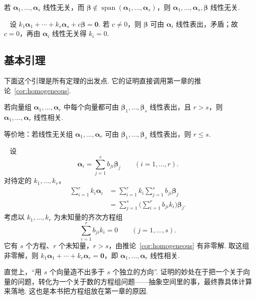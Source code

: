 \documentclass[lang=cn,10.5pt,scheme=chinese,toc=twocol,section,chinesefont=nofont,
twoside,citestyle=gb7714-2015,bibstyle=gb7714-2015]{elegantbook}
\DeclareRobustCommand{\textbf}[1]{{\lnsemiboldlatin\lnsemiboldcjk #1}}
\newcommand{\vv}[1]{\boldsymbol{#1}}
\newcommand{\zero}{\boldsymbol{0}}          %
\numberwithin{equation}{section}   %
\newcommand{\spn}{\operatorname{span}}      %
\newcommand*{\lnlabel}[1]{{\sffamily\bfseries\color{black}#1}}
\renewenvironment{proof}{%
	\par\noindent\lnlabel{\proofname}\;\ \color{black!90}\cfs}{\par}
\begin{document}
\begin{lemma}
  \label{lem:addone}
  若 $\vv\alpha_1,\ldots,\vv\alpha_s$ 线性无关，而 $\vv\beta\notin\spn(\vv\alpha_1,\ldots,\vv\alpha_s)$，则 $\vv\alpha_1,\ldots,\vv\alpha_s,\vv\beta$ 线性无关.
\end{lemma}
\begin{proof}
  设 $k_1\vv\alpha_1+\cdots+k_s\vv\alpha_s+c\vv\beta=\zero$. 若 $c\ne0$，则 $\vv\beta$ 可由 $\vv\alpha_i$ 线性表出，矛盾；故 $c=0$，再由 $\vv\alpha_i$ 线性无关得 $k_i=0$.
\end{proof}

\subsection{基本引理}

下面这个引理是所有定理的出发点. 它的证明直接调用第一章的推论~\ref{cor:homogeneous}.

\begin{lemma}[基本引理]\label{lem:rankineq}
  若向量组 $\vv{\alpha}_1,\ldots,\vv{\alpha}_r$ 中每个向量都可由 $\vv{\beta}_1,\ldots,\vv{\beta}_s$ 线性表出，且 $r>s$，则 $\vv{\alpha}_1,\ldots,\vv{\alpha}_r$ 线性相关.

  等价地：若线性无关组 $\vv{\alpha}_1,\ldots,\vv{\alpha}_r$ 可由 $\vv{\beta}_1,\ldots,\vv{\beta}_s$ 线性表出，则 $r\le s$.
\end{lemma}
\begin{proof}
  设
  \[\vv\alpha_i=\sum_{j=1}^s b_{ji}\vv\beta_j\qquad(i=1,\ldots,r).\]
  对待定的 $k_1,\ldots,k_r$，
  \[
    \begin{aligned}
      \sum_{i=1}^r k_i\vv\alpha_i & =\sum_{i=1}^r k_i\sum_{j=1}^s b_{ji}\vv\beta_j           \\
                                  & =\sum_{j=1}^s\Big(\sum_{i=1}^r b_{ji}k_i\Big)\vv\beta_j.
    \end{aligned}
  \]
  考虑以 $k_1,\ldots,k_r$ 为未知量的齐次方程组
  \[
    \sum_{i=1}^r b_{ji}k_i=0\qquad(j=1,\ldots,s).
  \]
  它有 $s$ 个方程、$r$ 个未知量，$r>s$，由推论~\ref{cor:homogeneous} 有非零解. 取这组非零解，则 $k_1\vv\alpha_1+\cdots+k_r\vv\alpha_r=\zero$，即 $\vv\alpha_1,\ldots,\vv\alpha_r$ 线性相关.
\end{proof}

\begin{motivebox}
  直觉上，“用 $s$ 个向量造不出多于 $s$ 个独立的方向”. 证明的妙处在于把一个关于向量的问题，转化为一个关于\textbf{数}的方程组问题——抽象空间里的事，最终靠具体计算来落地. 这也是本书把方程组放在第一章的原因.
\end{motivebox}
\end{document}
